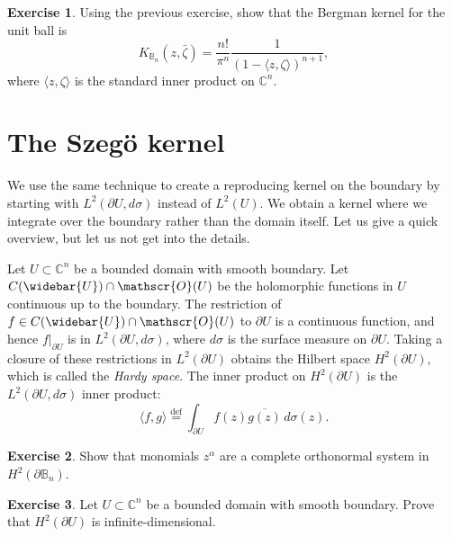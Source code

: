\documentclass[12pt,openany]{book}
\newcommand{\linnprod}[2]{\langle #1 , #2 \rangle}
\newcommand{\C}{{\mathbb{C}}}
\newcommand{\bB}{{\mathbb{B}}}
\newcommand{\sO}{{\mathscr{O}}}
\newcommand{\myindex}[1]{#1\index{#1}}
\theoremstyle{plain}
\theoremstyle{remark}
\theoremstyle{definition}
\newenvironment{exbox}{%
    \def\FrameCommand{\vrule width 1pt \relax\hspace{10pt}}%
    \MakeFramed{\advance\hsize-\width\FrameRestore}%
}{%
    \endMakeFramed
}
\theoremstyle{exercise}
\newtheorem{exercise}{Exercise}[section]
\theoremstyle{example}
\begin{document}
\begin{exbox}
\begin{exercise}
Using the previous exercise, show that the Bergman kernel for the unit ball
is
\begin{equation*}
K_{\bB_n}(z,\bar{\zeta}) =
\frac{n!}{\pi^n}\frac{1}{{(1-\linnprod{z}{\zeta})}^{n+1}},
\end{equation*}
where $\linnprod{z}{\zeta}$ is the standard inner product on $\C^n$.
\end{exercise}
\end{exbox}


\section{The Szeg{\"o} kernel}

We use the same technique to create a reproducing kernel on the
boundary by starting with $L^2(\partial U, d\sigma)$ instead of $L^2(U)$.
We obtain a
kernel where we integrate over the boundary rather than the domain itself.
Let us give a quick overview, but let us not get into the details.

Let $U \subset \C^n$ be a bounded domain with smooth boundary.  Let
$C(\widebar{U}) \cap \sO(U)$ be the holomorphic functions in $U$
continuous up to the boundary.  The restriction of
$f \in C(\widebar{U}) \cap \sO(U)$ to $\partial U$ is a continuous
function,
and hence $f|_{\partial U}$ is in $L^2(\partial U,d\sigma)$, where $d\sigma$
is the surface measure on $\partial U$.
Taking a closure
of these restrictions in $L^2(\partial U)$ obtains the Hilbert space
$H^2(\partial U)$,
%
which is called the \emph{\myindex{Hardy space}}.
The inner product on $H^2(\partial U)$ is the $L^2(\partial U,
d\sigma)$ inner product:
\begin{equation*}
\linnprod{f}{g} \overset{\text{def}}{=} \int_{\partial U} f(z)
\overline{g(z)} \, d\sigma(z) .
\end{equation*}

\begin{exbox}
\begin{exercise}
Show that monomials $z^\alpha$ are a complete orthonormal system in
$H^2(\partial \bB_n)$.
\end{exercise}

\begin{exercise}
Let $U \subset \C^n$ be a bounded domain with smooth boundary.
Prove that
$H^2(\partial U)$ is infinite-dimensional.
\end{exercise}
\end{exbox}
\end{document}
